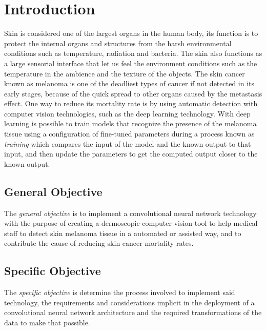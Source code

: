 \section{Introduction}
Skin is considered one of the largest organs in the human body, its function is to protect the internal organs and structures from the harsh environmental conditions such as temperature, radiation and bacteria. The skin also functions as a large sensorial interface that let us feel the environment conditions such as the temperature in the ambience and the texture of the objects.
The skin cancer known as melanoma is one of the deadliest types of cancer if not detected in its early stages, because of the quick spread to other organs caused by the metastasis effect. One way to reduce its mortality rate is by using automatic detection with computer vision technologies, such as the deep learning technology. With deep learning is possible to train models that recognize the presence of the melanoma tissue using a configuration of fine-tuned parameters during a process known as \emph{training} which compares the input of the model and the known output to that input, and then update the parameters to get the computed output closer to the known output.

\subsection{General Objective}
The \emph{general objective} is to implement a convolutional neural network technology with the purpose of creating a dermoscopic computer vision tool to help medical staff to detect skin melanoma tissue in a automated or assisted way, and to contribute the cause of reducing skin cancer mortality rates.

\subsection{Specific Objective}
The \emph{specific objective} is determine the process involved to implement said technology, the requirements and considerations implicit in the deployment of a convolutional neural network architecture and the required transformations of the data to make that possible.

